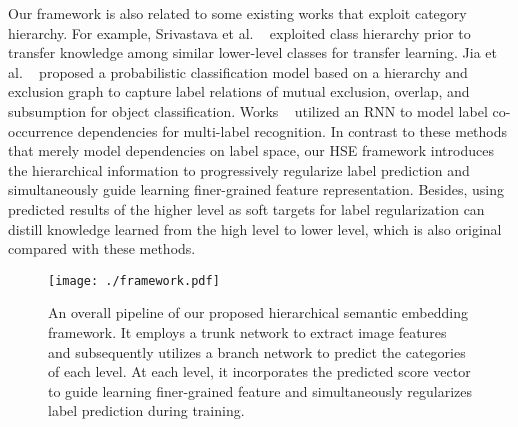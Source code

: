 \documentclass[sigconf]{acmart}
\begin{document}
Our framework is also related to some existing works that exploit category hierarchy. For example, Srivastava et al. ~\cite{srivastava2013discriminative} exploited class hierarchy prior to transfer knowledge among similar lower-level classes for transfer learning. Jia et al. ~\cite{deng2014large} proposed a probabilistic classification model based on a hierarchy and exclusion graph to capture label relations of mutual exclusion, overlap, and subsumption for object classification. Works ~\cite{wang2016cnn,chen2018recurrent} utilized an RNN to model label co-occurrence dependencies for multi-label recognition. In contrast to these methods that merely model dependencies on label space, our HSE framework introduces the hierarchical information to progressively regularize label prediction and simultaneously guide learning finer-grained feature representation. Besides, using predicted results of the higher level as soft targets for label regularization can distill knowledge learned from the high level to lower level, which is also original compared with these methods.

\begin{figure*}[!t]
   \centering{}
   \texttt{[image: ./framework.pdf]}
   \caption{An overall pipeline of our proposed hierarchical semantic embedding framework. It employs a trunk network to extract image features and subsequently utilizes a branch network to predict the categories of each level. At each level, it incorporates the predicted score vector to guide learning finer-grained feature and simultaneously regularizes label prediction during training.}
   \label{fig:framework}
\end{figure*}
\end{document}
